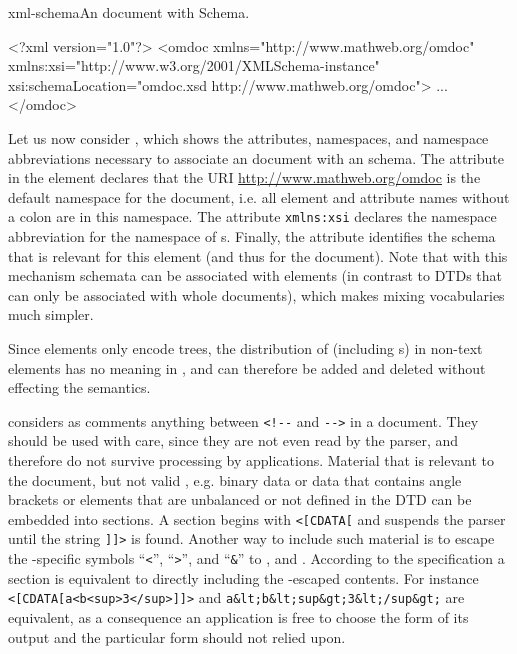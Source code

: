 \begin{myfig}{xml-schema}{An {\xml} document with {\xml} Schema.}\footnotesize
\begin{boxedverbatim}
<?xml version="1.0"?>
<omdoc xmlns="http://www.mathweb.org/omdoc" 
       xmlns:xsi="http://www.w3.org/2001/XMLSchema-instance" 
       xsi:schemaLocation="omdoc.xsd http://www.mathweb.org/omdoc">
 ...
</omdoc>
\end{boxedverbatim}
\end{myfig}
Let us now consider {}, which shows the attributes,
namespaces, and namespace abbreviations necessary to associate an {\xml} document
with an {\xml} schema. The {} attribute in the
{} element declares that the URI
{\url{http://www.mathweb.org/omdoc}} is the default namespace for the document,
i.e. all element and attribute names without a colon are in this namespace. The
attribute {\tt{xmlns:xsi}} declares the namespace abbreviation {} for
the namespace of {\xml} {s}.
Finally, the attribute {} identifies the {\xml}
schema that is relevant for this element (and thus for the document). Note that
with this mechanism schemata can be associated with elements (in contrast to DTDs
that can only be associated with whole documents), which makes mixing {\xml}
vocabularies much simpler.

Since {\xml} elements only encode trees, the distribution of {}
(including {s}) in non-text elements has no meaning in {\xml}, and
can therefore be added and deleted without effecting the semantics.

{\xml} considers as comments
anything between {\verb+<!--+} and {\verb+-->+} in a document. They should be used
with care, since they are not even read by the {\xml}
parser, and therefore do not survive
processing by {\xml} applications. Material that is relevant to the document, but
not valid {\xml}, e.g. binary data or data that contains angle brackets or
elements that are unbalanced or not defined in the DTD can be embedded into
{} sections. A {} section begins with {\verb+<[CDATA[+}
and suspends the {\xml} parser until the string {\verb+]]>+} is found. Another way
to include such material is to escape the {\xml}-specific symbols ``{\verb+<+}'',
``{\verb+>+}'', and ``{\verb+&+}'' to {}, {} and
{}. According to the {\xml} specification a {} section is
equivalent to directly including the {\xml}-escaped contents. For instance
{\verb+<[CDATA[a<b<sup>3</sup>]]>+} and {\verb+a&lt;b&lt;sup&gt;3&lt;/sup&gt;+}
are equivalent, as a consequence an {\xml} application is free to choose the form
of its output and the particular form should not relied upon.


